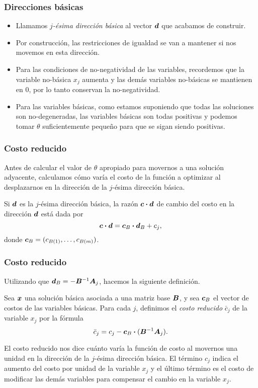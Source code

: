 \documentclass[aspectratio=169,12pt,spanish]{beamer}
\begin{document}
\begin{frame}
\frametitle{Direcciones básicas}

\begin{itemize}
\item Llamamos \emph{$j$-ésima dirección básica} al vector $\bm{d}$ que acabamos de construir. 
\item Por construcción, las restricciones de igualdad se van a mantener si nos movemos en esta dirección. 
\item Para las condiciones de no-negatividad de las variables, recordemos que la variable no-básica $x_j$ aumenta y las demás variables no-básicas se mantienen en 0, por lo tanto conservan la no-negatividad. 
\item Para las variables básicas, como estamos suponiendo que todas las soluciones son no-degeneradas, las variables básicas son todas positivas y podemos tomar $\theta$ suficientemente pequeño para que se sigan siendo positivas.
\end{itemize}

\end{frame}


\begin{frame}
\frametitle{Costo reducido}

Antes de calcular el valor de $\theta$ apropiado para movernos a una solución adyacente, calculamos cómo varía el costo de la función a optimizar al desplazarnos en la dirección de la $j$-ésima dirección básica.

Si $\bm{d}$ es la $j$-ésima dirección básica, la razón $\bm{c} \boldsymbol{\cdot} \bm{d}$ de cambio del costo en la dirección $\bm{d}$ está dada por
$$
\bm{c} \boldsymbol{\cdot} \bm{d} = \bm{c}_B \boldsymbol{\cdot} \bm{d}_B + c_j,
$$
donde $\bm{c}_B = (c_{B(1)}, \dots, c_{B(m)})$. 

\end{frame}


\begin{frame}
\frametitle{Costo reducido}

Utilizando que $\bm{d}_B = -\bm{B}^{-1}\bm{A}_{j}$, hacemos la siguiente definición.

\begin{definition}
Sea $\bm{x}$ una solución básica asociada a una matriz base  $\bm{B}$, y sea $\bm{c}_B$ el vector de costos de las variables básicas. Para cada $j$, definimos el \emph{costo reducido} $\bar c_j$ de la variable $x_j$ por la fórmula
$$
\bar c_j = c_j - \bm{c}_B \boldsymbol{\cdot} (\bm{B}^{-1}\bm{A}_{j}).
$$
\end{definition}

El costo reducido nos dice cuánto varía la función de costo al movernos una unidad en la dirección de la $j$-ésima dirección básica. El término $c_j$ indica el aumento del costo por unidad de la variable $x_j$ y el último término es el costo de modificar las demás variables para compensar el cambio en la variable $x_j$.


\end{frame}
\end{document}
